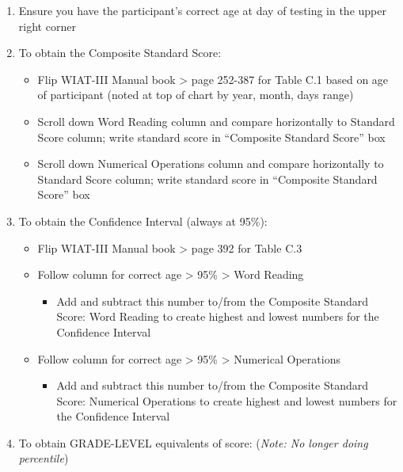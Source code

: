 \documentclass[]{book}
\providecommand{\tightlist}{%
  \setlength{\itemsep}{0pt}\setlength{\parskip}{0pt}}
\begin{document}
\begin{enumerate}
\def\labelenumi{\arabic{enumi}.}
\tightlist
\item
  Ensure you have the participant's correct age at day of testing in the upper right corner
\item
  To obtain the Composite Standard Score:

  \begin{itemize}
  \tightlist
  \item
    Flip WIAT-III Manual book \textgreater{} page 252-387 for Table C.1 based on age of participant (noted at top of chart by year, month, days range)
  \item
    Scroll down Word Reading column and compare horizontally to Standard Score column; write standard score in ``Composite Standard Score'' box
  \item
    Scroll down Numerical Operations column and compare horizontally to Standard Score column; write standard score in ``Composite Standard Score'' box
  \end{itemize}
\item
  To obtain the Confidence Interval (always at 95\%):

  \begin{itemize}
  \tightlist
  \item
    Flip WIAT-III Manual book \textgreater{} page 392 for Table C.3
  \item
    Follow column for correct age \textgreater{} 95\% \textgreater{} Word Reading

    \begin{itemize}
    \tightlist
    \item
      Add and subtract this number to/from the Composite Standard Score: Word Reading to create highest and lowest numbers for the Confidence Interval
    \end{itemize}
  \item
    Follow column for correct age \textgreater{} 95\% \textgreater{} Numerical Operations

    \begin{itemize}
    \tightlist
    \item
      Add and subtract this number to/from the Composite Standard Score: Numerical Operations to create highest and lowest numbers for the Confidence Interval
    \end{itemize}
  \end{itemize}
\item
  To obtain GRADE-LEVEL equivalents of score: (\emph{Note: No longer doing percentile})


\end{enumerate}
\end{document}

